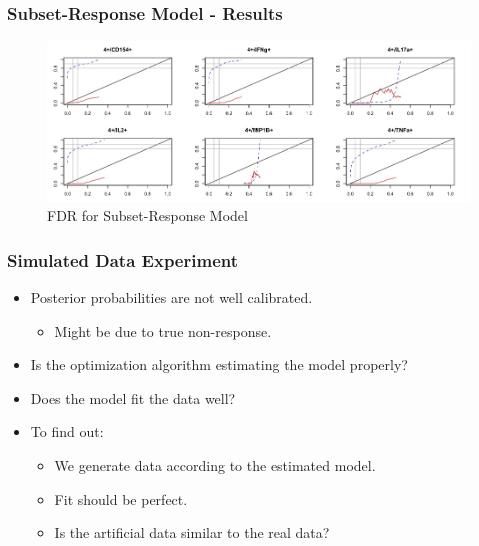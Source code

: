 \documentclass{beamer}
\theoremstyle{definition}
\begin{document}

\begin{frame}
\frametitle{Subset-Response Model - Results}
\begin{figure}[]
\includegraphics[width=12 cm]{figures/subsetBinomialFDR} \caption{FDR for Subset-Response Model}
\end{figure}
\end{frame}


\begin{frame}
\frametitle{Simulated Data Experiment}
\begin{itemize}
\item Posterior probabilities are not well calibrated.
	\begin{itemize}
	\item Might be due to true non-response.
	\end{itemize}
\pause
\vspace{0.5 cm}
\item Is the optimization algorithm estimating the model properly?
\vspace{0.5 cm}
\item Does the model fit the data well? 

\pause
\vspace{0.5 cm}
\item To find out:
	\begin{itemize}
	\item We generate data according to the estimated model.
	\item Fit should be perfect. 
	\item Is the artificial data similar to the real data?
	\end{itemize} 
\end{itemize}
\end{frame}

\end{document}

